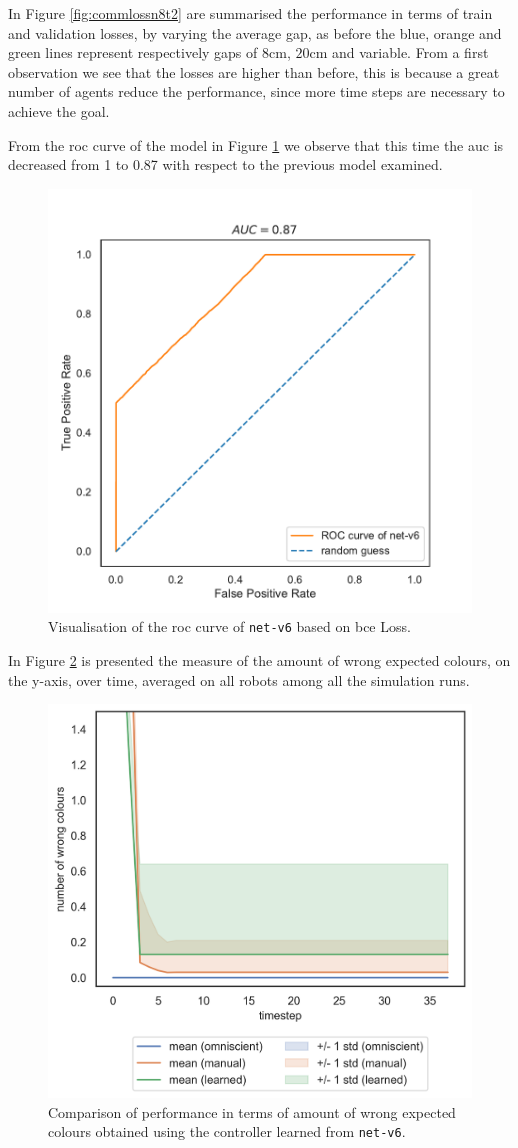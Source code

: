 \noindent
In Figure \ref{fig:commlossn8t2} are summarised the performance in terms of 
train and validation losses, by varying the average gap, as before the blue, orange 
and green lines represent respectively gaps of $8$\gls{cm}, $20$\gls{cm} and 
variable. 
From a first observation we see that the losses are higher than before, this is 
because a great number of agents reduce the performance, since more time steps 
are necessary to achieve the goal.

From the \gls{roc} curve of the model in Figure \ref{fig:net-v6auc} we observe 
that this time the \gls{auc} is decreased from 1 to 0.87 with respect to the 
previous model examined. 
\begin{figure}[!htb]
	\centering
	\includegraphics[width=.5\textwidth]{contents/images/net-v6/roc-net-v6(a)}%
	\caption[Evaluation of the \gls{roc} of \texttt{net-v6}.]{Visualisation of the 
		\gls{roc} curve of \texttt{net-v6} based on \gls{bce} Loss.}
	\label{fig:net-v6auc}
\end{figure}

\bigskip
In Figure \ref{fig:net-v6error} is presented the measure of the amount of wrong 
expected colours, on the y-axis, over time, averaged on all robots among all the 
simulation runs. 
\begin{figure}[!htb]
	\centering
	\includegraphics[width=.5\textwidth]{contents/images/net-v6/colours-errors-compressed}%
	\caption[Evaluation of \texttt{net-v6} amount of wrong expected 
	colours.]{Comparison of performance in terms of amount of wrong expected 
		colours obtained using the controller learned from \texttt{net-v6}.}
	\label{fig:net-v6error}
\end{figure}

